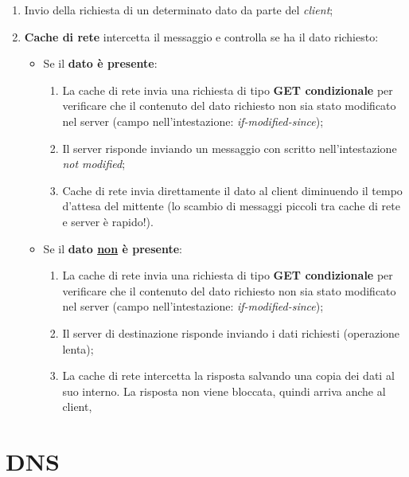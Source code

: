 \documentclass[a4paper]{article}
\begin{document}
	\begin{enumerate}
		\item Invio della richiesta di un determinato dato da parte del \emph{client};
		
		\item \textbf{Cache di rete} intercetta il messaggio e controlla se ha il dato richiesto:
		\begin{itemize}
			\item Se il \textbf{dato è presente}:
			\begin{enumerate}
				\item La cache di rete invia una richiesta di tipo \textcolor{Red3}{\textbf{GET condizionale}} per verificare che il contenuto del dato richiesto non sia stato modificato nel server (campo nell'intestazione: \emph{if-modified-since});
				
				\item Il server risponde inviando un messaggio con scritto nell'intestazione \emph{not modified};
				
				\item Cache di rete invia direttamente il dato al client diminuendo il tempo d'attesa del mittente (lo scambio di messaggi piccoli tra cache di rete e server è rapido!).
			\end{enumerate}
		
			\item Se il \textbf{dato \underline{non} è presente}:
			\begin{enumerate}
				\item La cache di rete invia una richiesta di tipo \textcolor{Red3}{\textbf{GET condizionale}} per verificare che il contenuto del dato richiesto non sia stato modificato nel server (campo nell'intestazione: \emph{if-modified-since});
				
				\item Il server di destinazione risponde inviando i dati richiesti (operazione lenta);
				
				\item La cache di rete intercetta la risposta salvando una copia dei dati al suo interno. La risposta non viene bloccata, quindi arriva anche al client,
			\end{enumerate}
		\end{itemize}
	\end{enumerate}

	\newpage
	
	\section{DNS}
	
\end{document}
